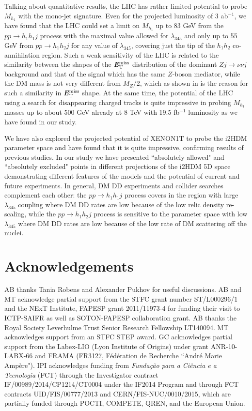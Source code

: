 \documentclass[12pt,a4paper]{article}
\newcommand{\MET}{\textbf{\textit{E}$_{\rm T}^{\rm miss}$}}
\begin{document}
Talking about quantitative results,
the LHC has rather limited potential to probe $M_{h_1}$
with the mono-jet signature. Even for the projected luminosity of 3 ab$^{-1}$,
we have found that the LHC could set a limit on $M_{h_1}$  up to 83 GeV
from the $pp\to h_1 h_1j$ process with the maximal value allowed for  $\lambda_{345}$
and  only up to 55 GeV from  $pp\to h_1 h_2j$
for any value of  $\lambda_{345}$, covering just the tip of the $h_1 h_2$ co-annihilation
region. Such a weak sensitivity of the LHC is related to
the similarity between the shapes of the \MET{} distribution of the dominant $Zj\to \nu\nu j$ background
and that of the signal which has the same $Z$-boson mediator, while the DM mass is not very different from $M_Z/2$,
which as shown in \cite{Belyaev:2016pxe} is the reason for such a similarity in \MET{} shape.
At the same time, the potential of the LHC using a search for disappearing charged tracks
is quite impressive  in probing  $M_{h_1}$ masses up to about 500 GeV
already at 8 TeV with 19.5 fb$^{-1}$ luminosity
as we have found in our study.


We have also explored the projected potential of XENON1T to probe the i2HDM
parameter space and have found that it is quite impressive,
confirming results of previous studies.
In our study we have presented  ``absolutely allowed"  and ``absolutely excluded" points
in different projections of the i2HDM 5D space demonstrating different features of the models
and the potential of current and future experiments.
In general, DM DD experiments and collider searches complement each other:
the $pp\to h_1 h_1j$ process covers in the region with large $\lambda_{345}$ coupling
where DM DD rates are low because of the low relic density re-scaling,
while the $pp\to h_1 h_2j$ process is sensitive to the parameter space with low $\lambda_{345}$
where DM DD rates are low because of the low rate of DM scattering off the nuclei.

\section*{Acknowledgements}

AB thanks Tania Robens and Alexander Pukhov for useful discussions.
AB and MT acknowledge partial support from the STFC grant number  ST/L000296/1
and the NExT Institute, FAPESP grant 2011/11973-4 for funding their visit to ICTP-SAIFR as well as SOTON-FAPESP collaboration grant.
AB thanks the Royal Society Leverhulme Trust Senior Research Fellowship LT140094.
MT acknowledges support from an STFC STEP award. 
GC acknowledges partial support from the Labex-LIO (Lyon Institute of Origins) under grant ANR-10-LABX-66 and FRAMA (FR3127, F\'ed\'eration de Recherche ``Andr\'e Marie Amp\`ere").
IPI acknowledges funding from \textit{Fun\-da\-\c{c}\~{a}o para a Ci\^{e}ncia e a Tecnologia} (FCT)
through the Investigator contract IF/00989/2014/CP1214/CT0004
under the IF2014 Program and through FCT contracts UID/FIS/00777/2013 and CERN/FIS-NUC/0010/2015,
which are partially funded through POCTI, COMPETE, QREN, and the European Union. 
\end{document}
